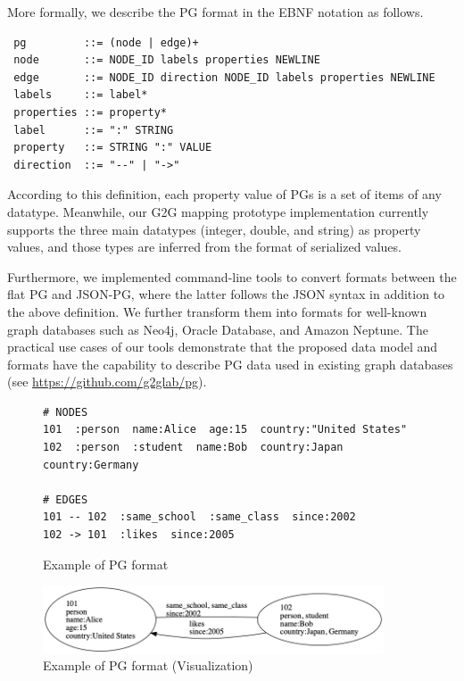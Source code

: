 \documentclass[runningheads]{llncs}
\begin{document}
More formally, we describe the PG format in the EBNF notation as follows.
\vspace{1ex}
\begin{defi}
\leavevmode
\begin{verbatim}
 pg         ::= (node | edge)+
 node       ::= NODE_ID labels properties NEWLINE
 edge       ::= NODE_ID direction NODE_ID labels properties NEWLINE
 labels     ::= label*
 properties ::= property*
 label      ::= ":" STRING
 property   ::= STRING ":" VALUE
 direction  ::= "--" | "->"
\end{verbatim}
\end{defi}

According to this definition, each property value of PGs is a set of items of any datatype. Meanwhile, our G2G mapping prototype implementation currently supports the three main datatypes (integer, double, and string) as property values, and those types are inferred from the format of serialized values.

Furthermore, we implemented command-line tools to convert formats between the flat PG and JSON-PG, where the latter follows the JSON syntax in addition to the above definition. We further transform them into formats for well-known graph databases such as Neo4j, Oracle Database, and Amazon Neptune. The practical use cases of our tools demonstrate that the proposed data model and formats have the capability to describe PG data used in existing graph databases (see \url{https://github.com/g2glab/pg}).

\begin{figure}[!t]
\begin{scriptsize}
\begin{verbatim}
# NODES
101  :person  name:Alice  age:15  country:"United States"
102  :person  :student  name:Bob  country:Japan  country:Germany

# EDGES
101 -- 102  :same_school  :same_class  since:2002
102 -> 101  :likes  since:2005
\end{verbatim}
\end{scriptsize}
\caption{Example of PG format}
\label{fig:example-pg}
\end{figure}


\begin{figure}
\center
\includegraphics[width=0.9\textwidth]{fig3.png}
\caption{Example of PG format (Visualization)}
\label{fig:pg_example_vis}
\end{figure}
\end{document}
